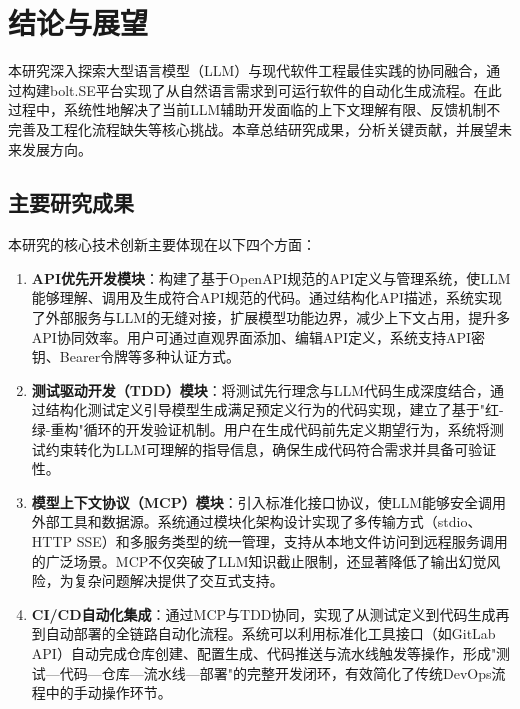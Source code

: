 
\chapter{结论与展望}
\label{chap:conclusion}

本研究深入探索大型语言模型（LLM）与现代软件工程最佳实践的协同融合，通过构建bolt.SE平台实现了从自然语言需求到可运行软件的自动化生成流程。在此过程中，系统性地解决了当前LLM辅助开发面临的上下文理解有限、反馈机制不完善及工程化流程缺失等核心挑战。本章总结研究成果，分析关键贡献，并展望未来发展方向。

\section{主要研究成果}

本研究的核心技术创新主要体现在以下四个方面：

\begin{enumerate}
  \item \textbf{API优先开发模块}：构建了基于OpenAPI规范的API定义与管理系统，使LLM能够理解、调用及生成符合API规范的代码。通过结构化API描述，系统实现了外部服务与LLM的无缝对接，扩展模型功能边界，减少上下文占用，提升多API协同效率。用户可通过直观界面添加、编辑API定义，系统支持API密钥、Bearer令牌等多种认证方式。
  
  \item \textbf{测试驱动开发（TDD）模块}：将测试先行理念与LLM代码生成深度结合，通过结构化测试定义引导模型生成满足预定义行为的代码实现，建立了基于"红-绿-重构"循环的开发验证机制。用户在生成代码前先定义期望行为，系统将测试约束转化为LLM可理解的指导信息，确保生成代码符合需求并具备可验证性。
  
  \item \textbf{模型上下文协议（MCP）模块}：引入标准化接口协议，使LLM能够安全调用外部工具和数据源。系统通过模块化架构设计实现了多传输方式（stdio、HTTP SSE）和多服务类型的统一管理，支持从本地文件访问到远程服务调用的广泛场景。MCP不仅突破了LLM知识截止限制，还显著降低了输出幻觉风险，为复杂问题解决提供了交互式支持。
  
  \item \textbf{CI/CD自动化集成}：通过MCP与TDD协同，实现了从测试定义到代码生成再到自动部署的全链路自动化流程。系统可以利用标准化工具接口（如GitLab API）自动完成仓库创建、配置生成、代码推送与流水线触发等操作，形成"测试—代码—仓库—流水线—部署"的完整开发闭环，有效简化了传统DevOps流程中的手动操作环节。
\end{enumerate}

